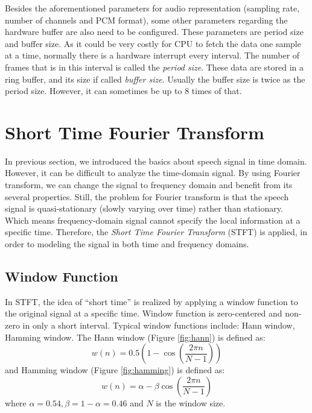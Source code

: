 \documentclass[11pt,a4paper]{report}
\begin{document}
Besides the aforementioned parameters for audio representation (sampling rate, number of channels and PCM format), some other parameters regarding the hardware buffer are also need to be configured. These parameters are period size and buffer size. As it could be very costly for CPU to fetch the data one sample at a time, normally there is a hardware interrupt every interval. The number of frames that is in this interval is called the \textit{period size}. These data are stored in a ring buffer, and its size if called \textit{buffer size}. Usually the buffer size is twice as the period size. However, it can sometimes be up to 8 times of that.


\section{Short Time Fourier Transform}
In previous section, we introduced the basics about speech signal in time domain. However, it can be difficult to analyze the time-domain signal. By using Fourier transform, we can change the signal to frequency domain and benefit from its several properties. Still, the problem for Fourier transform is that the speech signal is quasi-stationary (slowly varying over time) rather than stationary. Which means frequency-domain signal cannot specify the local information at a specific time. Therefore, the \textit{Short Time Fourier Transform} (STFT) is applied, in order to modeling the signal in both time and frequency domains.

\subsection{Window Function}
In STFT, the idea of ``short time'' is realized by applying a window function to the original signal at a specific time. Window function is zero-centered and non-zero in only a short interval. Typical window functions include: Hann window, Hamming window\cite{heinzel_spectrum_2002}. The Hann window (Figure \ref{fig:hann}) is defined as:
\[ w(n) = 0.5 (1 - \cos(\frac{2\pi n}{N-1})) \]
and Hamming window (Figure \ref{fig:hamming}) is defined as:
\[ w(n) = \alpha - \beta \cos(\frac{2\pi n}{N-1}) \]
where $\alpha = 0.54, \beta = 1 - \alpha = 0.46$ and $N$ is the window size.
\end{document}

